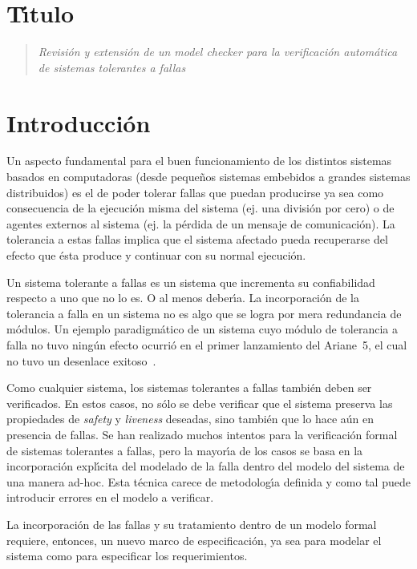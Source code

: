 \documentclass[12pt]{article}
\begin{document}
\section{T\'\i{}tulo}
%

\begin{quote}
  \setlength{\parsep}{1ex}\raggedright\large\sl%
  Revisi\'on y extensi\'on de un model checker para la
  verificaci\'on autom\'atica de sistemas tolerantes a fallas
\end{quote}

\section{Introducci\'on}
 

Un aspecto fundamental para el buen funcionamiento de los distintos
sistemas basados en computadoras (desde peque\~nos sistemas embebidos
a grandes sistemas distribuidos) es el de poder tolerar fallas que
puedan producirse ya sea como consecuencia de la ejecuci\'on misma del
sistema (ej. una divisi\'on por cero) o de agentes externos al sistema
(ej. la p\'erdida de un mensaje de comunicaci\'on).
%
La tolerancia a estas fallas implica que el sistema afectado pueda
recuperarse del efecto que \'esta produce y continuar con su normal
ejecuci\'on.

Un sistema tolerante a fallas es un sistema que incrementa su
confiabilidad respecto a uno que no lo es.
%
O al menos deber\'\i{}a.
%
La incorporaci\'on de la tolerancia a falla en un sistema no es algo
que se logra por mera redundancia de m\'odulos.
%
Un ejemplo paradigm\'atico de un sistema cuyo m\'odulo de tolerancia a
falla no tuvo ning\'un efecto ocurri\'o en el primer lanzamiento del
Ariane~5, el cual no tuvo un desenlace exitoso~\cite{ariane}.

Como cualquier sistema, los sistemas tolerantes a fallas tambi\'en
deben ser verificados.
%
En estos casos, no s\'olo se debe verificar que el sistema preserva
las propiedades de \emph{safety} y \emph{liveness} deseadas, sino
tambi\'en que lo hace a\'un en presencia de fallas.
%
Se han realizado muchos intentos para la verificaci\'on formal de
sistemas tolerantes a fallas, pero la mayor\'\i{}a de los casos se basa
en la incorporaci\'on expl\'\i{}cita del modelado de la falla dentro
del modelo del sistema de una manera ad-hoc.
%
Esta t\'ecnica carece de metodolog\'\i{}a definida y como tal puede
introducir errores en el modelo a verificar.

La incorporaci\'on de las fallas y su tratamiento dentro de un modelo
formal requiere, entonces, un nuevo marco de especificaci\'on, ya sea
para modelar el sistema como para especificar los requerimientos.
%
\end{document}
